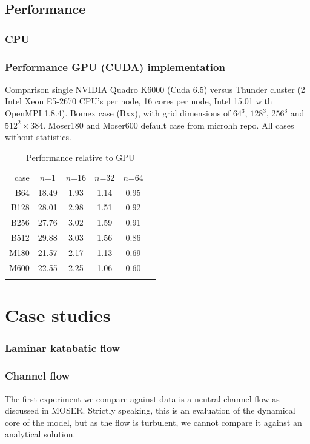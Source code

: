 \documentclass[gmd]{copernicus}
\begin{document}
\subsection{Performance}\label{sec:performance}
\subsubsection{CPU}
\subsubsection{Performance GPU (CUDA) implementation}

Comparison single NVIDIA Quadro K6000 (Cuda 6.5) versus Thunder cluster (2 Intel Xeon E5-2670 CPU's per node, 16 cores per node, Intel 15.01 with OpenMPI 1.8.4). Bomex case (Bxx), with grid dimensions of $64^3$, $128^3$, $256^3$ and $512^2 \times 384$. Moser180 and Moser600 default case from microhh repo. All cases without statistics. 

\begin{table}[t]
\caption{Performance relative to GPU}
\begin{tabular}{rccccc}
\tophline
case & $n$=1 & $n$=16 & $n$=32 & $n$=64   \\
\middlehline
B64  & 18.49 & 1.93 & 1.14 & 0.95 \\
B128 & 28.01 & 2.98 & 1.51 & 0.92 \\
B256 & 27.76 & 3.02 & 1.59 & 0.91 \\
B512 & 29.88 & 3.03 & 1.56 & 0.86 \\
\middlehline
M180 & 21.57 & 2.17 & 1.13 & 0.69 \\
M600 & 22.55 & 2.25 & 1.06 & 0.60 \\
\bottomhline
\end{tabular}
\end{table}


\section{Case studies}\label{sec:casestudies}
\subsubsection{Laminar katabatic flow}


\subsubsection{Channel flow}
The first experiment we compare against data is a neutral channel flow as discussed in MOSER. Strictly speaking, this is an evaluation of the dynamical core of the model, but as the flow is turbulent, we cannot compare it against an analytical solution.
\end{document}
